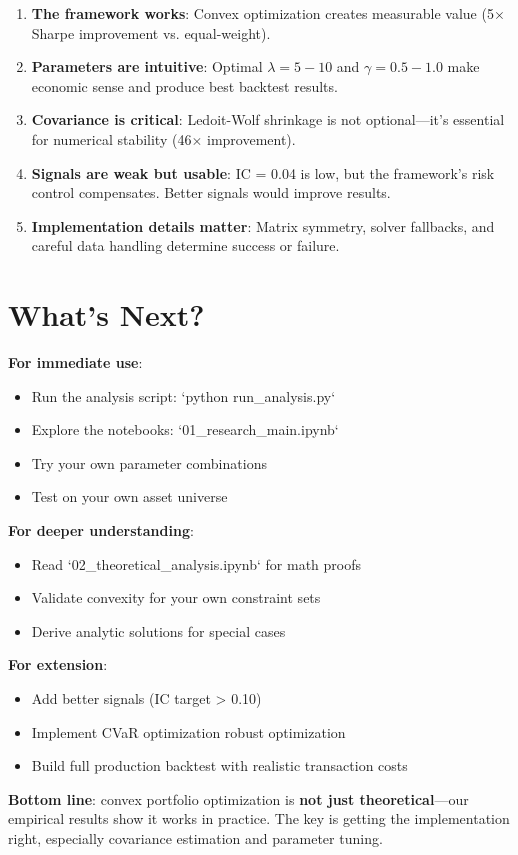 \documentclass[a4paper,12pt]{article}
\begin{document}
\begin{enumerate}
    \item \textbf{The framework works}: Convex optimization creates measurable value (5$\times$ Sharpe improvement vs. equal-weight).

    \item \textbf{Parameters are intuitive}: Optimal $\lambda=5-10$ and $\gamma=0.5-1.0$ make economic sense and produce best backtest results.

    \item \textbf{Covariance is critical}: Ledoit-Wolf shrinkage is not optional—it's essential for numerical stability (46$\times$ improvement).

    \item \textbf{Signals are weak but usable}: IC = 0.04 is low, but the framework's risk control compensates. Better signals would improve results.

    \item \textbf{Implementation details matter}: Matrix symmetry, solver fallbacks, and careful data handling determine success or failure.
\end{enumerate}

\section{What's Next?}

\textbf{For immediate use}:
\begin{itemize}
    \item Run the analysis script: `python run_analysis.py`
    \item Explore the notebooks: `01_research_main.ipynb`
    \item Try your own parameter combinations
    \item Test on your own asset universe
\end{itemize}

\textbf{For deeper understanding}:
\begin{itemize}
    \item Read `02_theoretical_analysis.ipynb` for math proofs
    \item Validate convexity for your own constraint sets
    \item Derive analytic solutions for special cases
\end{itemize}

\textbf{For extension}:
\begin{itemize}
    \item Add better signals (IC target > 0.10)
    \item Implement CVaR optimization
    \test robust optimization
    \item Build full production backtest with realistic transaction costs
\end{itemize}

\vspace{1cm}
\noindent \textbf{Bottom line}: convex portfolio optimization is \textbf{not just theoretical}—our empirical results show it works in practice. The key is getting the implementation right, especially covariance estimation and parameter tuning.
\end{document}
